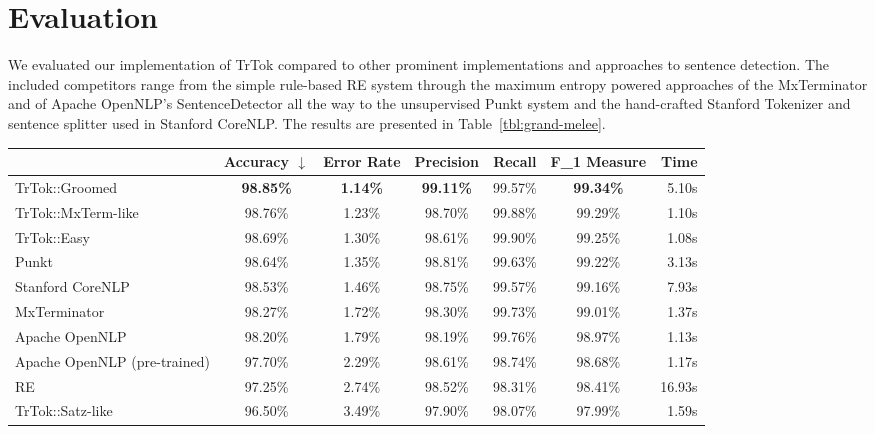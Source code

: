 \section{Evaluation}
\label{sec:eval}

We evaluated our implementation of TrTok compared to other prominent
implementations and approaches to sentence detection. The included
competitors range from the simple rule-based RE system through the
maximum entropy powered approaches of the MxTerminator and of Apache
OpenNLP's SentenceDetector all the way to the unsupervised Punkt
system and the hand-crafted Stanford Tokenizer and sentence splitter
used in Stanford CoreNLP. The results are presented in
Table~\ref{tbl:grand-melee}.

\begin{table*}
  \begin{center}
    \begin{tabular}{ | l | c | c | c | c | c | r | }
      \hline
      & Accuracy $\downarrow$ & Error Rate & Precision
      & Recall & F_1 Measure & Time \\ \hline
      TrTok::Groomed & \textbf{98.85\%} & \textbf{1.14\%} & \textbf{99.11\%}
                     & 99.57\% & \textbf{99.34\%} & 5.10s \\ \hline
      TrTok::MxTerm-like & 98.76\% & 1.23\% & 98.70\%
                         & 99.88\% & 99.29\% & 1.10s \\ \hline
      TrTok::Easy & 98.69\% & 1.30\% & 98.61\%
                  & 99.90\% & 99.25\% & 1.08s \\ \hline
      Punkt & 98.64\% & 1.35\% & 98.81\%
            & 99.63\% & 99.22\% & 3.13s \\ \hline
      Stanford CoreNLP & 98.53\% & 1.46\% & 98.75\%
                       & 99.57\% & 99.16\% & 7.93s \\ \hline
      MxTerminator & 98.27\% & 1.72\% & 98.30\%
                   & 99.73\% & 99.01\% & 1.37s \\ \hline
      Apache OpenNLP & 98.20\% & 1.79\% & 98.19\%
                     & 99.76\% & 98.97\% & 1.13s \\ \hline
      Apache OpenNLP (pre-trained) & 97.70\% & 2.29\% & 98.61\%
                                   & 98.74\% & 98.68\% & 1.17s \\ \hline
      RE & 97.25\% & 2.74\% & 98.52\%
         & 98.31\% & 98.41\% & 16.93s \\ \hline
      TrTok::Satz-like & 96.50\% & 3.49\% & 97.90\%
                       & 98.07\% & 97.99\% & 1.59s \\ \hline

\end{tabular}
\end{center}
\end{table*}
